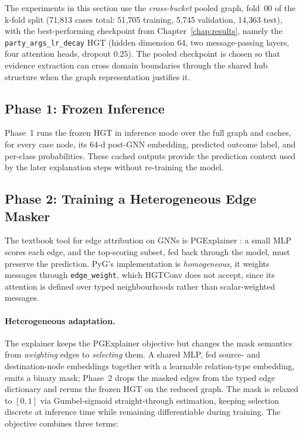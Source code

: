 The experiments in this section use the \emph{cross-bucket} pooled
graph, fold~00 of the k-fold split (71{,}813 cases total: 51{,}705
training, 5{,}745 validation, 14{,}363 test), with the
best-performing checkpoint from Chapter~\ref{chap:results}, namely
the \texttt{party\_args\_lr\_decay} HGT (hidden dimension 64, two
message-passing layers, four attention heads, dropout $0.25$). The
pooled checkpoint is chosen so that evidence extraction can cross
domain boundaries through the shared hub structure when the graph
representation justifies it.

\subsection{Phase 1: Frozen Inference}

Phase~1 runs the frozen HGT in inference mode over the full graph
and caches, for every case node, its 64-d post-GNN embedding,
predicted outcome label, and per-class probabilities. These cached
outputs provide the prediction context used by the later explanation
steps without re-training the model.

\subsection{Phase 2: Training a Heterogeneous Edge Masker}

The textbook tool for edge attribution on GNNs is PGExplainer
\cite{luo2020parameterized}: a small MLP scores each edge, and the
top-scoring subset, fed back through the model, must preserve the
prediction. PyG's implementation is \emph{homogeneous}, it
weights messages through \texttt{edge\_weight}, which HGTConv does
not accept, since its attention is defined over typed neighbourhoods
rather than scalar-weighted messages.

\paragraph{Heterogeneous adaptation.}
The explainer keeps the PGExplainer objective but changes the mask
semantics from \emph{weighting} edges to \emph{selecting} them. A
shared MLP, fed source- and destination-node embeddings together
with a learnable relation-type embedding, emits a binary mask;
Phase~2 drops the masked edges from the typed edge dictionary and
reruns the frozen HGT on the reduced graph. The mask is relaxed to
$[0,1]$ via Gumbel-sigmoid straight-through estimation, keeping
selection discrete at inference time while remaining differentiable
during training. The objective combines three terms:

